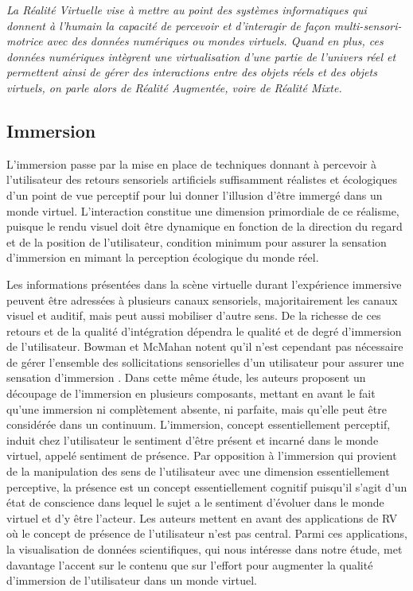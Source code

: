 \textit{La Réalité Virtuelle vise à mettre au point des systèmes informatiques qui donnent à l'humain la capacité de percevoir et d’interagir de façon multi-sensori-motrice avec des données numériques ou mondes virtuels. Quand en plus, ces données numériques intègrent une virtualisation d’une partie de l’univers réel et permettent ainsi de gérer des interactions entre des objets réels et des objets virtuels, on parle alors de Réalité Augmentée, voire de Réalité Mixte.
}

\subsection{Immersion}

L'immersion passe par la mise en place de techniques donnant à percevoir à l'utilisateur des retours sensoriels artificiels suffisamment réalistes et écologiques d'un point de vue perceptif pour lui donner l'illusion d'être immergé dans un monde virtuel. L'interaction constitue une dimension primordiale de ce réalisme, puisque le rendu visuel doit être dynamique en fonction de la direction du regard et de la position de l'utilisateur, condition minimum pour assurer la sensation d'immersion en mimant la perception écologique du monde réel. 

Les informations présentées dans la scène virtuelle durant l'expérience  immersive peuvent être adressées à plusieurs canaux sensoriels, majoritairement les canaux visuel et auditif, mais peut aussi mobiliser d'autre sens. De la richesse de ces retours et de la qualité d'intégration dépendra le qualité et de degré d'immersion de l'utilisateur. Bowman et McMahan notent qu'il n'est cependant pas nécessaire de gérer l'ensemble des sollicitations sensorielles d'un utilisateur pour assurer une sensation d'immersion  \cite{bowman_virtual_2007}. Dans cette même étude, les auteurs proposent un découpage de l'immersion en plusieurs composants, mettant en avant le fait qu'une immersion ni complètement absente, ni parfaite, mais qu'elle peut être considérée dans un continuum. L'immersion, concept essentiellement perceptif, induit chez l'utilisateur le sentiment d'être présent et incarné dans le monde virtuel, appelé sentiment de présence. Par opposition à l'immersion qui provient de la manipulation des sens de l'utilisateur avec une dimension essentiellement perceptive, la présence est un concept essentiellement cognitif puisqu'il s'agit d'un état de conscience dans lequel le sujet a le sentiment d'évoluer dans le monde virtuel et d'y être l'acteur. Les auteurs mettent en avant des applications de RV où le concept de présence de l'utilisateur n'est pas central. Parmi ces applications, la visualisation de données scientifiques, qui nous intéresse dans notre étude, met davantage l'accent sur le contenu que sur l'effort pour augmenter la qualité d'immersion de l'utilisateur dans un monde virtuel.

